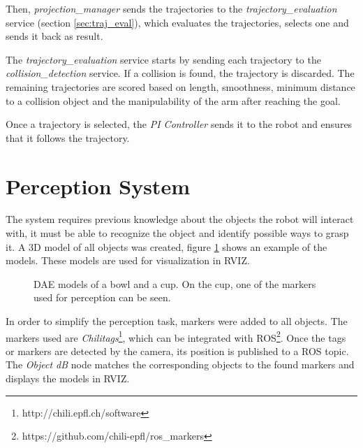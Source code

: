 Then, \textit{projection\_manager} sends the trajectories to the \textit{trajectory\_evaluation} service (section \ref{sec:traj_eval}), which evaluates the trajectories, selects one and sends it back as result. 

The \textit{trajectory\_evaluation} service starts by sending each trajectory to the \textit{collision\_detection} service. If a collision is found, the trajectory is discarded. The remaining trajectories are scored based on length, smoothness, minimum distance to a collision object and the manipulability of the arm after reaching the goal. 

Once a trajectory is selected, the \textit{PI Controller} sends it to the robot and ensures that it follows the trajectory.

\section{Perception System}
\label{sec:perception}

The system requires previous knowledge about the objects the robot will interact with, it must be able to recognize the object and identify possible ways to grasp it. A 3D model of all objects was created, figure \ref{fig:model} shows an example of the models. These models are used for visualization in RVIZ. 
\begin{figure}[H]
	\centering
	\begin{subfigure}
		{\texttt{[image: bowl3.png]}}
	\end{subfigure}
	\hspace{15pt}
	\begin{subfigure}
		{\texttt{[image: cup3.png]}}
	\end{subfigure}
	\vspace{-12pt}
	\caption[3D models]{DAE models of a bowl and a cup. On the cup, one of the markers used for perception can be seen.}
	\vspace{-10pt}
	\label{fig:model}
\end{figure}

In order to simplify the perception task, markers were added to all objects. The markers used are \textit{Chilitags}\footnote{http://chili.epfl.ch/software}, which can be integrated with ROS\footnote{https://github.com/chili-epfl/ros\_markers}. Once the tags or markers are detected by the camera, its position is published to a ROS topic. The \textit{Object dB} node matches the corresponding objects to the found markers and displays the models in RVIZ.

